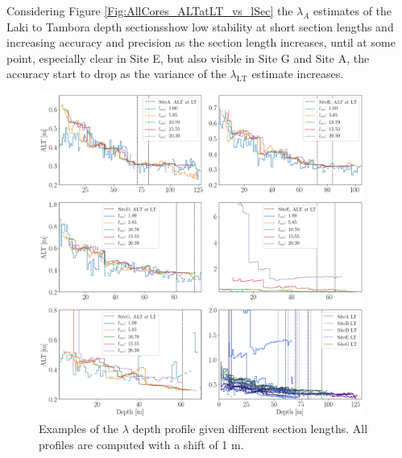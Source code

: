 \documentclass[../../CompleteThesis2/Complete_2ndDraft]{subfiles}
\begin{document}
Considering Figure \ref{Fig:AllCores_ALTatLT_vs_lSec} the $\lambda_A$ estimates  of the Laki to Tambora depth sectionsshow low stability at short section lengths and increasing accuracy and precision as the section length increases, until at some point, especially clear in Site E, but also visible in Site G and Site A, the accuracy start to drop as the variance of the $\lambda_{\text{LT}}$ estimate increases.
\begin{figure}[h]
	\centering
	\includegraphics[width=0.95\textwidth]{AllCores_ALT_at_DiffLsecs.png}
	\caption[$\lambda$ Depth Profiles, Different $l_{\text{sec}}$]{\small Examples of the $\lambda$ depth profile given different section lengths. All profiles are computed with a shift of 1 m.}
	\label{fig:AllCores_ALT_at_DiffLsecs}
\end{figure}
\end{document}

